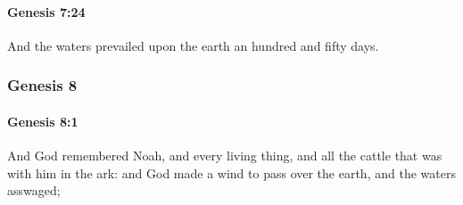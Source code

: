 		\paragraph{Genesis 7:24} %
			\label{GENESIS-7-24}

			And the waters prevailed upon the earth an hundred and fifty days.

	\subsubsection{Genesis 8} %
		\label{GENESIS-8}

		\paragraph{Genesis 8:1} %
			\label{GENESIS-8-1}

			And God remembered Noah, and every living thing, and all the cattle that was with him in the ark: and God made a wind to pass over the earth, and the waters asswaged;

